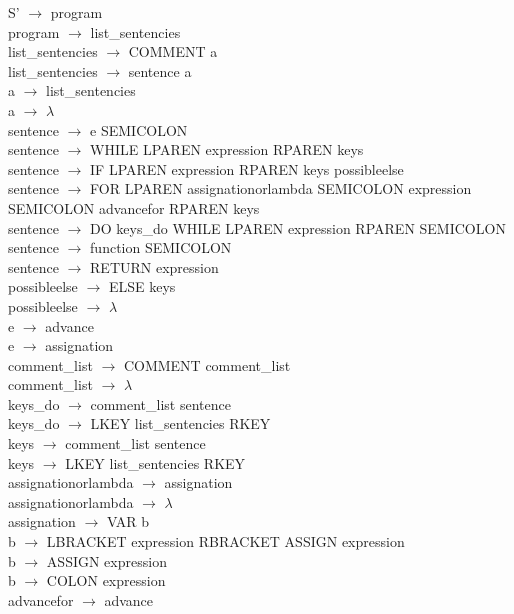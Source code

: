 \documentclass[10pt,a4paper]{article}
\begin{document}
S' $\rightarrow$ program \\
program $\rightarrow$ list\_sentencies \\
list\_sentencies $\rightarrow$ COMMENT a \\
list\_sentencies $\rightarrow$ sentence a \\
a $\rightarrow$ list\_sentencies \\
a $\rightarrow$ $\lambda$ \\
sentence $\rightarrow$ e SEMICOLON \\
sentence $\rightarrow$ WHILE LPAREN expression RPAREN keys \\
sentence $\rightarrow$ IF LPAREN expression RPAREN keys possibleelse \\
sentence $\rightarrow$ FOR LPAREN assignationorlambda SEMICOLON expression SEMICOLON advancefor RPAREN keys \\
sentence $\rightarrow$ DO keys\_do WHILE LPAREN expression RPAREN SEMICOLON \\
sentence $\rightarrow$ function SEMICOLON \\
sentence $\rightarrow$ RETURN expression \\
possibleelse $\rightarrow$ ELSE keys \\
possibleelse $\rightarrow$ $\lambda$ \\
e $\rightarrow$ advance \\
e $\rightarrow$ assignation \\
comment\_list $\rightarrow$ COMMENT comment\_list \\
comment\_list $\rightarrow$ $\lambda$ \\
keys\_do $\rightarrow$ comment\_list sentence \\
keys\_do $\rightarrow$ LKEY list\_sentencies RKEY \\
keys $\rightarrow$ comment\_list sentence \\
keys $\rightarrow$ LKEY list\_sentencies RKEY \\
assignationorlambda $\rightarrow$ assignation \\
assignationorlambda $\rightarrow$ $\lambda$ \\
assignation $\rightarrow$ VAR b \\
b $\rightarrow$ LBRACKET expression RBRACKET ASSIGN expression \\
b $\rightarrow$ ASSIGN expression \\
b $\rightarrow$ COLON expression \\
advancefor $\rightarrow$ advance \\
\end{document}
